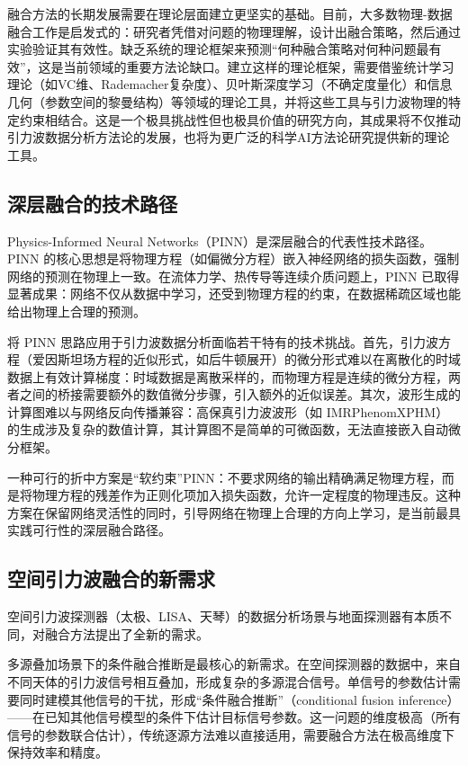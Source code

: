 融合方法的长期发展需要在理论层面建立更坚实的基础。目前，大多数物理-数据融合工作是启发式的：研究者凭借对问题的物理理解，设计出融合策略，然后通过实验验证其有效性。缺乏系统的理论框架来预测“何种融合策略对何种问题最有效”，这是当前领域的重要方法论缺口。建立这样的理论框架，需要借鉴统计学习理论（如VC维、Rademacher复杂度）、贝叶斯深度学习（不确定度量化）和信息几何（参数空间的黎曼结构）等领域的理论工具，并将这些工具与引力波物理的特定约束相结合。这是一个极具挑战性但也极具价值的研究方向，其成果将不仅推动引力波数据分析方法论的发展，也将为更广泛的科学AI方法论研究提供新的理论工具。

\subsection{深层融合的技术路径}

Physics-Informed Neural Networks（PINN）是深层融合的代表性技术路径。PINN 的核心思想是将物理方程（如偏微分方程）嵌入神经网络的损失函数，强制网络的预测在物理上一致。在流体力学、热传导等连续介质问题上，PINN 已取得显著成果：网络不仅从数据中学习，还受到物理方程的约束，在数据稀疏区域也能给出物理上合理的预测。

将 PINN 思路应用于引力波数据分析面临若干特有的技术挑战。首先，引力波方程（爱因斯坦场方程的近似形式，如后牛顿展开）的微分形式难以在离散化的时域数据上有效计算梯度：时域数据是离散采样的，而物理方程是连续的微分方程，两者之间的桥接需要额外的数值微分步骤，引入额外的近似误差。其次，波形生成的计算图难以与网络反向传播兼容：高保真引力波波形（如 IMRPhenomXPHM）的生成涉及复杂的数值计算，其计算图不是简单的可微函数，无法直接嵌入自动微分框架。

一种可行的折中方案是“软约束”PINN：不要求网络的输出精确满足物理方程，而是将物理方程的残差作为正则化项加入损失函数，允许一定程度的物理违反。这种方案在保留网络灵活性的同时，引导网络在物理上合理的方向上学习，是当前最具实践可行性的深层融合路径。

\subsection{空间引力波融合的新需求}

空间引力波探测器（太极、LISA、天琴）的数据分析场景与地面探测器有本质不同，对融合方法提出了全新的需求。

多源叠加场景下的条件融合推断是最核心的新需求。在空间探测器的数据中，来自不同天体的引力波信号相互叠加，形成复杂的多源混合信号。单信号的参数估计需要同时建模其他信号的干扰，形成“条件融合推断”（conditional fusion inference）——在已知其他信号模型的条件下估计目标信号参数。这一问题的维度极高（所有信号的参数联合估计），传统逐源方法难以直接适用，需要融合方法在极高维度下保持效率和精度。

